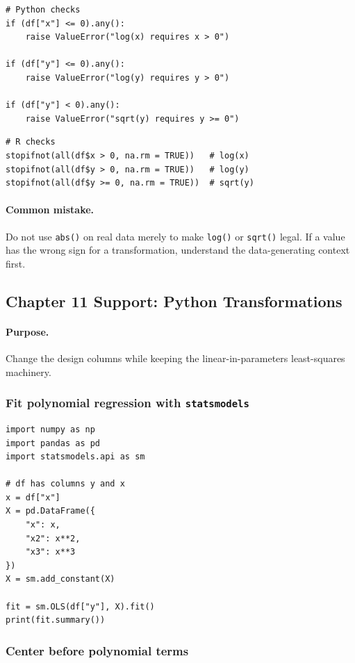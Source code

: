 \begin{verbatim}
# Python checks
if (df["x"] <= 0).any():
    raise ValueError("log(x) requires x > 0")

if (df["y"] <= 0).any():
    raise ValueError("log(y) requires y > 0")

if (df["y"] < 0).any():
    raise ValueError("sqrt(y) requires y >= 0")
\end{verbatim}

\begin{verbatim}
# R checks
stopifnot(all(df$x > 0, na.rm = TRUE))   # log(x)
stopifnot(all(df$y > 0, na.rm = TRUE))   # log(y)
stopifnot(all(df$y >= 0, na.rm = TRUE))  # sqrt(y)
\end{verbatim}

\paragraph{Common mistake.} Do not use \texttt{abs()} on real data merely to make \texttt{log()} or \texttt{sqrt()} legal.  If a value has the wrong sign for a transformation, understand the data-generating context first.

\subsection{Chapter 11 Support: Python Transformations}
\label{app:ch11-software-cookbook-python}

\paragraph{Purpose.} Change the design columns while keeping the linear-in-parameters least-squares machinery.

\subsubsection*{Fit polynomial regression with \texttt{statsmodels}}

\begin{verbatim}
import numpy as np
import pandas as pd
import statsmodels.api as sm

# df has columns y and x
x = df["x"]
X = pd.DataFrame({
    "x": x,
    "x2": x**2,
    "x3": x**3
})
X = sm.add_constant(X)

fit = sm.OLS(df["y"], X).fit()
print(fit.summary())
\end{verbatim}

\subsubsection*{Center before polynomial terms}

